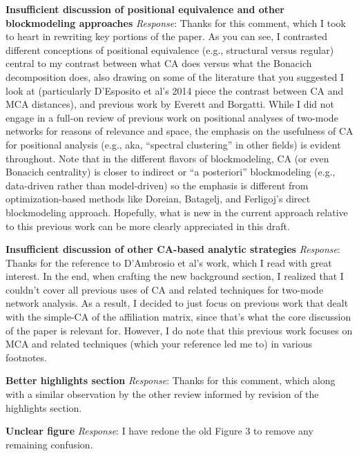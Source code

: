 \documentclass{article}
\begin{document}
\noindent\textbf{Insufficient discussion of positional equivalence and other blockmodeling approaches}\newline
\textit{Response}: Thanks for this comment, which I took to heart in rewriting key portions of the paper. As you can see, I contrasted different conceptions of positional equivalence (e.g., structural versus regular) central to my contrast between what CA does versus what the Bonacich decomposition does, also drawing on some of the literature that you suggested I look at (particularly D'Esposito et al's 2014 piece the contrast between CA and MCA distances), and previous work by Everett and Borgatti. While I did not engage in a full-on review of previous work on positional analyses of two-mode networks for reasons of relevance and space, the emphasis on the usefulness of CA for positional analysis (e.g., aka, ``spectral clustering'' in other fields) is evident throughout. Note that in the different flavors of blockmodeling, CA (or even Bonacich centrality) is closer to indirect or ``a posteriori'' blockmodeling (e.g., data-driven rather than model-driven) so the emphasis is different from optimization-based methods like Doreian, Batagelj, and Ferligoj's direct blockmodeling approach. Hopefully, what is new in the current approach relative to this previous work can be more clearly appreciated in this draft. \newline

\noindent\textbf{Insufficient discussion of other CA-based analytic strategies}\newline
\textit{Response}: Thanks for the reference to D’Ambrosio et al's work, which I read with great interest. In the end, when crafting the new background section, I realized that I couldn't cover all previous uses of CA and related techniques for two-mode network analysis. As a result, I decided to just focus on previous work that dealt with the simple-CA of the affiliation matrix, since that's what the core discussion of the paper is relevant for. However, I do note that this previous work focuses on MCA and related techniques (which your reference led me to) in various footnotes. \newline

\noindent\textbf{Better highlights section}\newline
\textit{Response}: Thanks for this comment, which along with a similar observation by the other review informed by revision of the highlights section. \newline

\noindent\textbf{Unclear figure}\newline
\textit{Response}: I have redone the old Figure 3 to remove any remaining confusion. \newline
\end{document}

